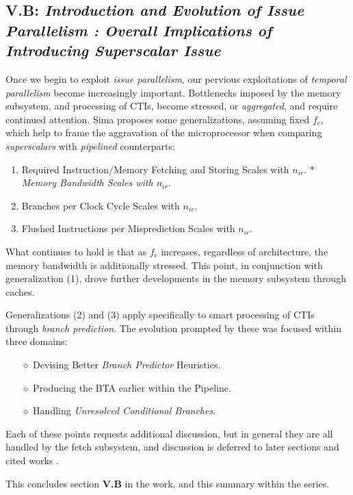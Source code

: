\documentclass{article}
\begin{document}
\subsection{\textbf{V.B}: \emph{Introduction and Evolution of Issue Parallelism : Overall Implications of Introducing Superscalar Issue}}
Once we begin to exploit \emph{issue parallelism}, our pervious exploitations of \emph{temporal parallelism} become increasingly important. 
Bottlenecks imposed by the memory subsystem, and processing of CTIs, become stressed, or \emph{aggregated}, and require continued attention. 
Sima proposes some generalizations, assuming fixed $f_{c}$, which help to frame the aggravation of the microprocessor when comparing \emph{superscalars} with \emph{pipelined} counterparts:
\begin{enumerate}
    \item Required Instruction/Memory Fetching and Storing Scales with $n_{ir}$.
    \subitem \(\ast\) \emph{Memory Bandwidth Scales with $n_{ir}$}.
    \item Branches per Clock Cycle Scales with $n_{ir}$.
    \item Flushed Instructions per Misprediction Scales with $n_{ir}$.
\end{enumerate}
What continues to hold is that as $f_{c}$ increases, regardless of architecture, the memory bandwidth is additionally stressed. 
This point, in conjunction with generalization (1), drove further developments in the memory subsystem through caches. 

Generalizations (2) and (3) apply specifically to smart processing of CTIs through \emph{branch prediction}. 
The evolution prompted by these was focused within three domains:
\begin{itemize}
    \item[\(\diamond\)] Devising Better \emph{Branch Predictor} Heuristics.
    \item[\(\diamond\)] Producing the BTA earlier within the Pipeline.
    \item[\(\diamond\)] Handling \emph{Unresolved Conditional Branches}.
\end{itemize}
Each of these points requests additional discussion, but in general they are all handled by the fetch subsystem, and discussion is deferred to later sections and cited works \cite{Sima}. 

This concludes section \textbf{V.B} in the work, and this summary within the series. 
\end{document}
